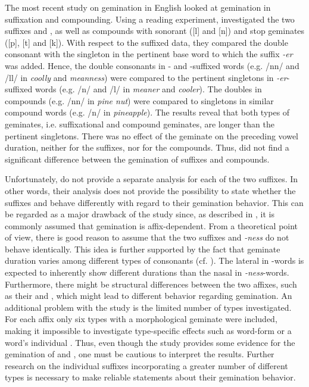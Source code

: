 The most recent study on gemination in English looked at gemination in {suffixation} and compounding. Using a reading experiment, \cite{Kotzor.2016} investigated the two suffixes  and , as well as compounds with sonorant ([l] and [n]) and stop geminates ([p], [t] and [k]). With respect to the suffixed data, they compared the double consonant with the singleton in the pertinent base word to which the suffix \textit{-er} was added. Hence, the double consonants in - and -suffixed words (e.g. /nn/  and /ll/ in \textit{coolly} and \textit{meanness}) were compared to the pertinent singletons in \textit{-er}-suffixed words (e.g. /n/ and /l/ in \textit{meaner} and \textit{cooler}). The doubles in compounds (e.g. /nn/ in \textit{pine nut}) were compared to singletons in similar compound words (e.g. /n/ in \textit{pineapple}). 
The results reveal that both types of geminates, i.e. suffixational and compound geminates, are longer than the pertinent singletons. There was no effect of the geminate on the preceding vowel duration, neither for the suffixes, nor for the compounds. Thus, \cite{Kotzor.2016} did not find a significant difference between the gemination of suffixes and compounds. 

Unfortunately, \cite{Kotzor.2016} do not provide a separate analysis for each of the two suffixes. In other words, their analysis does not provide the possibility to state whether the suffixes  and  behave differently with regard to their gemination behavior. This can be regarded as a major drawback of the study since, as described in , it is commonly assumed that gemination is affix-dependent. From a theoretical point of view, there is good reason to assume that the two suffixes  and \textit{-ness} do not behave identically. 
This idea is further supported by the fact that geminate duration varies among different types of consonants (cf. ). The lateral in -words is expected to inherently show different durations than the nasal in \textit{-ness}-words. Furthermore, there might be structural differences between the two affixes, such as their  and , which might lead to different behavior regarding gemination. 
An additional problem with the study is the limited number of types investigated. For each affix only six types with a {morphological geminate} were included, making it impossible to investigate type-specific effects such as word-form  or a word's individual . Thus, even though the study provides some evidence for the gemination of  and , one must be cautious to interpret the results. Further research on the individual suffixes incorporating a greater number of different types is necessary to make reliable statements about their gemination behavior.


